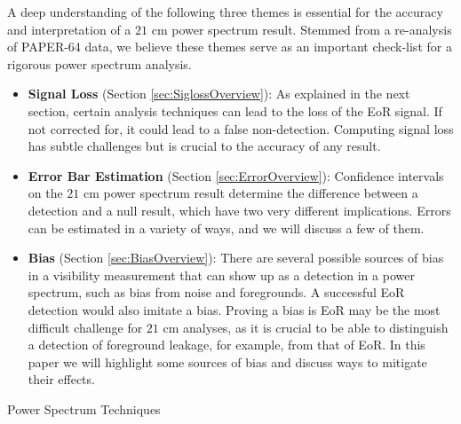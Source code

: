 \documentclass[preprint2,numberedappendix,tighten]{aastex6}  %
\begin{document}
A deep understanding of the following three themes is essential for the accuracy and interpretation of a $21$ cm power spectrum result. Stemmed from a re-analysis of PAPER-64 data, we believe these themes serve as an important check-list for a rigorous power spectrum analysis.
\begin{itemize}
\item \textbf{Signal Loss} (Section \ref{sec:SiglossOverview}): As explained in the next section, certain analysis techniques can lead to the loss of the EoR signal. If not corrected for, it could lead to a false non-detection. Computing signal loss has subtle challenges but is crucial to the accuracy of any result.
\item \textbf{Error Bar Estimation} (Section \ref{sec:ErrorOverview}): Confidence intervals on the $21$ cm power spectrum result determine the difference between a detection and a null result, which have two very different implications. Errors can be estimated in a variety of ways, and we will discuss a few of them.
\item \textbf{Bias} (Section \ref{sec:BiasOverview}): There are several possible sources of bias in a visibility measurement that can show up as a detection in a power spectrum, such as bias from noise and foregrounds. A successful EoR detection would also imitate a bias. Proving a bias is EoR may be the most difficult challenge for $21$ cm analyses, as it is crucial to be able to distinguish a detection of foreground leakage, for example, from that of EoR. In this paper we will highlight some sources of bias and discuss ways to mitigate their effects.
\end{itemize}

\begin{center}
Power Spectrum Techniques
\end{center}
\end{document}
